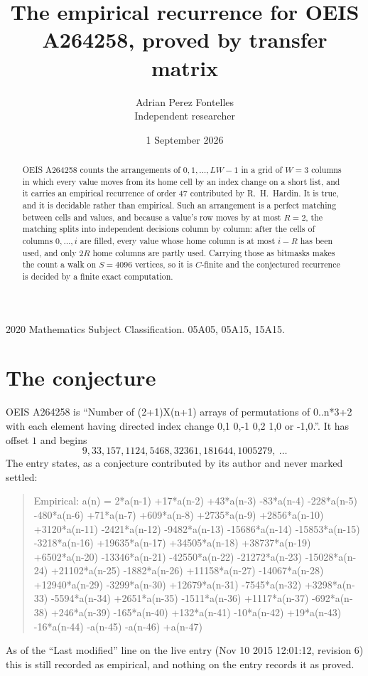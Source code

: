 \documentclass[11pt,a4paper]{article}
\title{The empirical recurrence for OEIS A264258, proved by transfer matrix}
\author{Adrian Perez Fontelles\\ \small Independent researcher}
\date{1 September 2026}
\theoremstyle{plain}
\theoremstyle{definition}
\begin{document}
\maketitle

\begin{abstract}
OEIS A264258 counts the arrangements of $0,1,\dots,LW-1$ in a grid of $W=3$ columns in which
every value moves from its home cell by an index change on a short list, and it carries an
empirical recurrence of order $47$ contributed by R.~H.~Hardin. It is true, and it is
decidable rather than empirical. Such an arrangement is a perfect matching between cells and
values, and because a value's row moves by at most $R=2$, the matching splits into
independent decisions column by column: after the cells of columns $0,\dots,i$ are filled,
every value whose home column is at most $i-R$ has been used, and only $2R$ home columns are
partly used. Carrying those as bitmasks makes the count a walk on $S=4096$ vertices, so it is
$C$-finite and the conjectured recurrence is decided by a finite exact computation.
\end{abstract}

\noindent\small 2020 Mathematics Subject Classification. 05A05, 05A15, 15A15.\normalsize

\section{The conjecture}

OEIS A264258 is ``Number of (2+1)X(n+1) arrays of permutations of 0..n*3+2 with each element having directed index change 0,1 0,-1 0,2 1,0 or -1,0.''. It has offset $1$ and begins
\[
9, 33, 157, 1124, 5468, 32361, 181644, 1005279,\ \dots
\]
The entry states, as a conjecture contributed by its author and never marked settled:
\begin{quote}
Empirical: a(n) = 2*a(n-1) +17*a(n-2) +43*a(n-3) -83*a(n-4) -228*a(n-5) -480*a(n-6) +71*a(n-7) +609*a(n-8) +2735*a(n-9) +2856*a(n-10) +3120*a(n-11) -2421*a(n-12) -9482*a(n-13) -15686*a(n-14) -15853*a(n-15) -3218*a(n-16) +19635*a(n-17) +34505*a(n-18) +38737*a(n-19) +6502*a(n-20) -13346*a(n-21) -42550*a(n-22) -21272*a(n-23) -15028*a(n-24) +21102*a(n-25) -1882*a(n-26) +11158*a(n-27) -14067*a(n-28) +12940*a(n-29) -3299*a(n-30) +12679*a(n-31) -7545*a(n-32) +3298*a(n-33) -5594*a(n-34) +2651*a(n-35) -1511*a(n-36) +1117*a(n-37) -692*a(n-38) +246*a(n-39) -165*a(n-40) +132*a(n-41) -10*a(n-42) +19*a(n-43) -16*a(n-44) -a(n-45) -a(n-46) +a(n-47)
\end{quote}
As of the ``Last modified'' line on the live entry (Nov 10 2015 12:01:12, revision 6) this is still
recorded as empirical, and nothing on the entry records it as proved.
\end{document}
